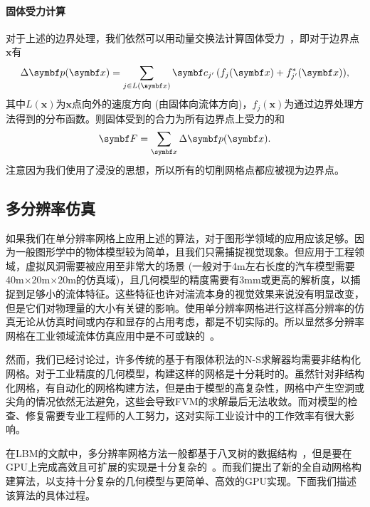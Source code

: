 \paragraph{固体受力计算}
对于上述的边界处理，我们依然可以用动量交换法计算固体受力~\citep{Ladd-1994, Mei-2002}，即对于边界点$\bm{x}$有
\begin{equation}
    \Delta \bm{p}(\bm{x})= \sum_{j\in L(\bm{x})} \bm{c}_{j'}\,(f_{j}(\bm{x}) + f^*_{j'}(\bm{x})),\vspace*{-1.5mm}
\end{equation}
其中$L(\bm{x})$为$\bm{x}$点向外的速度方向 (由固体向流体方向)，$f_{j}(\bm{x})$为通过边界处理方法得到的分布函数。则固体受到的合力为所有边界点上受力的和
\begin{equation}
    \bm{F} = \sum_{\bm{x}} \Delta \bm{p}(\bm{x}).\vspace*{-1mm}
\end{equation}
注意因为我们使用了浸没的思想，所以所有的切削网格点都应被视为边界点。

\subsection{多分辨率仿真}
\label{sec:multi-res}
如果我们在单分辨率网格上应用上述的算法，对于图形学领域的应用应该足够。因为一般图形学中的物体模型较为简单，且我们只需捕捉视觉现象。但应用于工程领域，虚拟风洞需要被应用至非常大的场景 (一般对于4m左右长度的汽车模型需要40m$\times$20m$\times$20m的仿真域)，且几何模型的精度需要有3mm或更高的解析度，以捕捉到足够小的流体特征。这些特征也许对湍流本身的视觉效果来说没有明显改变，但是它们对物理量的大小有关键的影响。使用单分辨率网格进行这样高分辨率的仿真无论从仿真时间或内存和显存的占用考虑，都是不切实际的。所以显然多分辨率网格在工业领域流体仿真应用中是不可或缺的~\citep{Hou-2019,Aultman-2022,Romani-2022}。

然而，我们已经讨论过，许多传统的基于有限体积法的N-S求解器均需要非结构化网格。对于工业精度的几何模型，构建这样的网格是十分耗时的。虽然针对非结构化网格，有自动化的网格构建方法，但是由于模型的高复杂性，网格中产生空洞或尖角的情况依然无法避免，这些会导致FVM的求解最后无法收敛。而对模型的检查、修复需要专业工程师的人工努力，这对实际工业设计中的工作效率有很大影响。

在LBM的文献中，多分辨率网格方法一般都基于八叉树的数据结构~\citep{EitelAmor-2013,Hasert-2014}，但是要在GPU上完成高效且可扩展的实现是十分复杂的~\citep{Schornbaum-2016, Schornbaum-2018}。而我们提出了新的全自动网格构建算法，以支持十分复杂的几何模型与更简单、高效的GPU实现。下面我们描述该算法的具体过程。


